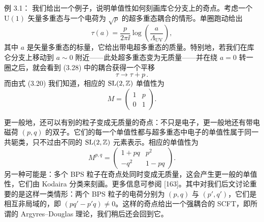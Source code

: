 
\begin{examplebox}{例 3.1：}
我们给出一个例子，说明单值性如何刻画库仑分支上的奇点。考虑一个 $\mathrm{U}(1)$ 矢量多重态与一个电荷为 $\sqrt{p}$ 的超多重态耦合的情形。单圈跑动给出
\begin{equation}
  \tau(a) = \frac{p}{2\pi \ii}\log\left(\frac{a}{\Lambda_{\mathrm{UV}}}\right),
  \tag{3.28}
\end{equation}
其中 $a$ 是矢量多重态的标量，它给出带电超多重态的质量。特别地，若我们在库仑分支上移动到 $a\sim 0$ 附近——此处超多重态变为无质量——并在绕 $a=0$ 转一圈之后，就会看到 (3.28) 中的耦合获得一个平移
\begin{equation}
  \tau \to \tau + p \,.
  \tag{3.29}
\end{equation}
而由式 (3.20) 我们知道，相应的 $\mathrm{SL}(2,\mathbb{Z})$ 单值性为
\begin{equation}
  M = \begin{pmatrix}
    1 & p \\
    0 & 1
  \end{pmatrix}.
  \tag{3.30}
\end{equation}
\end{examplebox}


更一般地，还可以有别的粒子变成无质量的奇点：不只是电子，更一般地还有带电磁荷 $(p,q)$ 的双子。它们的每一个单值性都与超多重态中电子的单值性属于同一共轭类，只不过由不同的 $\mathrm{SL}(2,\mathbb{Z})$ 元素表示。相应的单值性为
\begin{equation}
  M^{p,q} = \begin{pmatrix}
    1+pq & p^2 \\
    -q^2 & 1-pq
  \end{pmatrix}.
  \tag{3.31}
\end{equation}
另一种可能是：多个 BPS 粒子在奇点处同时变成无质量，这会产生更一般的单值性，它们由 Kodaira 分类来刻画。更多信息可参阅 [163]。其中对我们后文讨论重要的是这样一类情形：两个 BPS 粒子的电荷分别为 $(p,q)$ 与 $(p',q')$，它们是相互非局域的，即 $(pq'-p'q)\neq 0$。这样的奇点给出一个强耦合的 SCFT，即所谓的 Argyres--Douglas 理论，我们稍后还会回到它。


